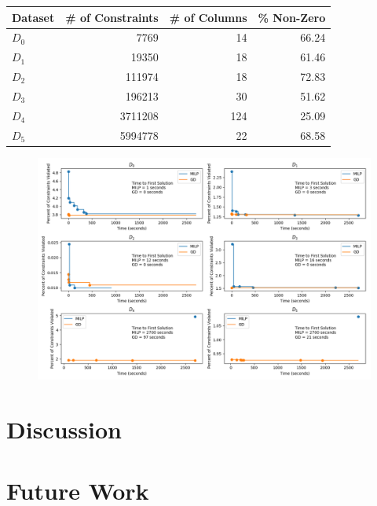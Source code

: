 \documentclass[a4paper]{article}
\begin{document}
\begin{tabular}{|l|r|r|r|}
\toprule
Dataset &  \# of Constraints &  \# of Columns &  \% Non-Zero \\
\midrule
         $D_0$ &                   7769 &                 14 &         66.24 \\
         $D_1$ &                  19350 &                 18 &         61.46 \\
         $D_2$ &                 111974 &                 18 &         72.83 \\
         $D_3$ &                 196213 &                 30 &         51.62 \\
         $D_4$ &                3711208 &                124 &         25.09 \\
         $D_5$ &                5994778 &                 22 &         68.58 \\
\bottomrule
\end{tabular}


\begin{figure}
	\includegraphics[width=\textwidth]{./time_series.png}
\end{figure}



\section{Discussion}
\section{Future Work}




\end{document}
